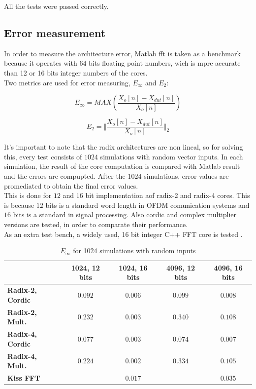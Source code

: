 \documentclass[conference]{IEEEtran}
\begin{document}
All the tests were passed correctly.

\subsection{Error measurement}

In order to measure the architecture error, Matlab fft is taken as a benchmark because it operates with 64 bits floating point numbers,
wich is mpre accurate than 12 or 16 bits integer numbers of the cores.\\

Two metrics are used for error measuring, $E_\infty$ and $E_2$:

\begin{equation}
E_\infty = MAX(\frac{ X_o[n] - X_{dut}[n]}{X_o[n]})
\label{eq:norma1}
\end{equation}

\begin{equation}
E_2 = \Vert\frac{X_o[n] - X_{dut}[n]}{X_o[n]}\Vert_2
\label{eq:norma2}
\end{equation}
 
It's important to note that the radix architectures are non lineal, so for solving this, every test consists of $1024$ simulations with random vector inputs.
In each simulation, the result of the core computation is compared with Matlab result and the errors are compupted. After the $1024$ simulations, 
error values are promediated to obtain the final error values.\\
This is done for $12$ and $16$ bit implementation aof radix-2 and radix-4 cores. This is because $12$ bits is a standard word length in OFDM comunication systems 
and $16$ bits is a standard in signal processing. Also cordic and complex multiplier versions are tested, in order to comparate their performance.\\
As an extra test bench, a widely used, 16 bit integer C++ FFT core is tested \cite{KISSFFT}.

\begin{table}[htb!]
\begin{tabular}{l c c c c}
 & \textbf{1024, 12 bits} & \textbf{1024, 16 bits} & \textbf{4096, 12 bits} & \textbf{4096, 16 bits}\\ \hline 
\textbf{Radix-2, Cordic} & $0.092$ & $0.006$ & $0.099$ & $0.008 $\\
\textbf{Radix-2, Mult.} & $0.232$ & $0.003$ & $0.340$ & $0.108$\\
\textbf{Radix-4, Cordic} & $0.077$ & $0.003$ & $0.074$ & $0.007$\\
\textbf{Radix-4, Mult.} & $0.224$ & $0.002$ & $0.334$ & $0.105$\\
\textbf{Kiss FFT} & $ $ & $0.017$ & $ $ & $0.035$\\\hline
\end{tabular}
\caption{$E_\infty$ for 1024 simulations with random inputs}
\label{table:errorInf}
\end{table}
\end{document}
